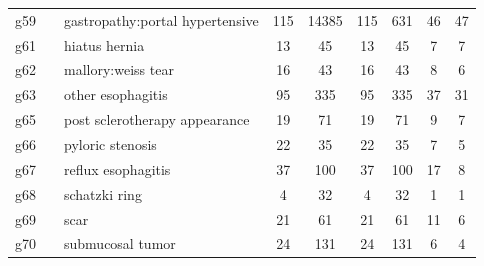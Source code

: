 \documentclass[preprint]{article}
\begin{document}
\begin{longtable}{c|l|l|c|c|c|c|c|c}
g59 &  & gastropathy:portal hypertensive & 115 & 14385 & 115 & 631 & 46 & 47 \\ 
g61 &  & hiatus hernia & 13 & 45 & 13 & 45 & 7 & 7 \\ 
g62 &  & mallory:weiss tear & 16 & 43 & 16 & 43 & 8 & 6 \\ 
g63 &  & other esophagitis & 95 & 335 & 95 & 335 & 37 & 31 \\ 
g65 &  & post sclerotherapy appearance & 19 & 71 & 19 & 71 & 9 & 7 \\ 
g66 &  & pyloric stenosis & 22 & 35 & 22 & 35 & 7 & 5 \\ 
g67 &  & reflux esophagitis & 37 & 100 & 37 & 100 & 17 & 8 \\ 
g68 &  & schatzki ring & 4 & 32 & 4 & 32 & 1 & 1 \\ 
g69 &  & scar & 21 & 61 & 21 & 61 & 11 & 6 \\ 
g70 &  & submucosal tumor & 24 & 131 & 24 & 131 & 6 & 4 \\ 


\end{longtable}
\end{document}
